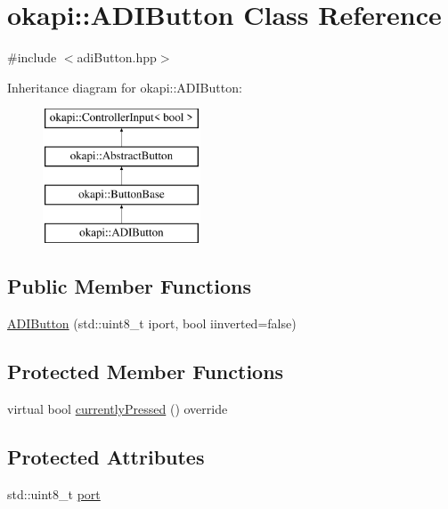 \hypertarget{classokapi_1_1ADIButton}{}\section{okapi\+::A\+D\+I\+Button Class Reference}
\label{classokapi_1_1ADIButton}


{\ttfamily \#include $<$adi\+Button.\+hpp$>$}

Inheritance diagram for okapi\+::A\+D\+I\+Button\+:\begin{figure}[H]
\begin{center}
\leavevmode
\includegraphics[height=4.000000cm]{classokapi_1_1ADIButton}
\end{center}
\end{figure}
\subsection*{Public Member Functions}
\begin{DoxyCompactItemize}
\item 
\mbox{\hyperlink{classokapi_1_1ADIButton_a84065174f1fd89bfb1aba7634c4c36d9}{A\+D\+I\+Button}} (std\+::uint8\+\_\+t iport, bool iinverted=false)
\end{DoxyCompactItemize}
\subsection*{Protected Member Functions}
\begin{DoxyCompactItemize}
\item 
virtual bool \mbox{\hyperlink{classokapi_1_1ADIButton_af37e345e8239a572021c0b0b31f859aa}{currently\+Pressed}} () override
\end{DoxyCompactItemize}
\subsection*{Protected Attributes}
\begin{DoxyCompactItemize}
\item 
std\+::uint8\+\_\+t \mbox{\hyperlink{classokapi_1_1ADIButton_a0bded65076f7c921a55377a5abe0b407}{port}}
\end{DoxyCompactItemize}


